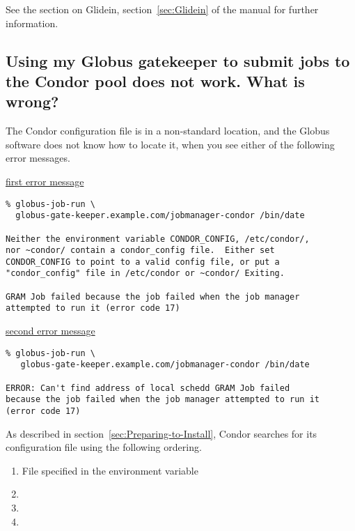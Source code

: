 See the section on Glidein, section~\ref{sec:Glidein} of the manual
for further information.


\subsection*{Using my Globus gatekeeper to submit jobs to the Condor pool
does not work.  What is wrong?}

The Condor configuration file is in a non-standard location,
and the Globus software does not know how to locate it,
when you see either of the following error messages.

\underline{first error message}
\footnotesize
\begin{verbatim}
% globus-job-run \
  globus-gate-keeper.example.com/jobmanager-condor /bin/date

Neither the environment variable CONDOR_CONFIG, /etc/condor/,
nor ~condor/ contain a condor_config file.  Either set
CONDOR_CONFIG to point to a valid config file, or put a
"condor_config" file in /etc/condor or ~condor/ Exiting.

GRAM Job failed because the job failed when the job manager
attempted to run it (error code 17)
\end{verbatim}
\normalsize

\underline{second error message}
\footnotesize
\begin{verbatim}
% globus-job-run \
   globus-gate-keeper.example.com/jobmanager-condor /bin/date

ERROR: Can't find address of local schedd GRAM Job failed
because the job failed when the job manager attempted to run it
(error code 17)
\end{verbatim}
\normalsize

As described in
section~\ref{sec:Preparing-to-Install}, 
Condor searches for its configuration file using the following
ordering.
\begin{enumerate}
\item File specified in the  environment variable
\item {}
\item {}
\item {}
\end{enumerate}

